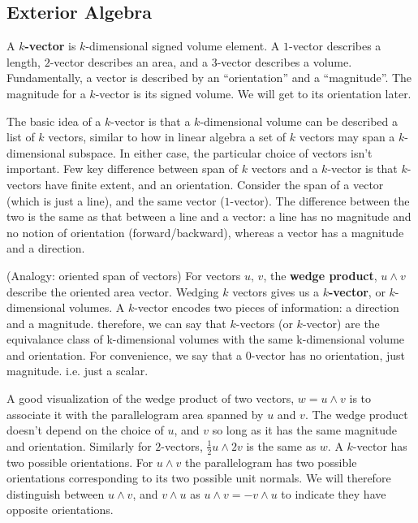 \subsection{Exterior Algebra}

A \textbf{$k$-vector} is  $k$-dimensional signed volume element. A $1$-vector describes a length, $2$-vector describes an area, and a $3$-vector describes a volume. Fundamentally, a vector is described by an ``orientation'' and a ``magnitude''. The magnitude for a $k$-vector is its signed volume. We will get to its orientation later.

The basic idea of a $k$-vector is that a $k$-dimensional volume can be described a list of $k$ vectors, similar to how in linear algebra a set of $k$ vectors may span a $k$-dimensional subspace. In either case, the particular choice of vectors isn't important. Few key difference between span of $k$ vectors and a $k$-vector is that $k$-vectors have finite extent, and an orientation. Consider the span of a vector (which is just a line), and the same vector ($1$-vector). The difference between the two is the same as that between a line and a vector: a line has no magnitude and no notion of orientation (forward/backward), whereas a vector has a magnitude and a direction.

\begin{definition}
    (Analogy: oriented span of vectors)
    For vectors $u,\,v$, the \textbf{wedge product}, $u \wedge v$ describe the oriented area vector. Wedging $k$ vectors gives us a \textbf{$k$-vector}, or $k$-dimensional volumes. A $k$-vector encodes two pieces of information: a direction and a magnitude. therefore, we can say that $k$-vectors (or $k$-vector) are the equivalance class of k-dimensional volumes with the same k-dimensional volume and orientation. For convenience, we say that a $0$-vector has no orientation, just magnitude. i.e. just a scalar.
\end{definition}

A good visualization of the wedge product of two vectors, $w = u\wedge v$ is to associate it with the parallelogram area spanned by $u$ and $v$. The wedge product doesn't depend on the choice of $u$, and $v$ so long as it has the same magnitude and orientation. Similarly for $2$-vectors, $\frac{1}{2}u \wedge 2v$ is the same as $w$. A $k$-vector has two possible orientations. For $u \wedge v$ the parallelogram has two possible orientations corresponding to its two possible unit normals. We will therefore distinguish between $u \wedge v$, and $v \wedge u$ as $u \wedge v = - v \wedge u$ to indicate they have opposite orientations.

